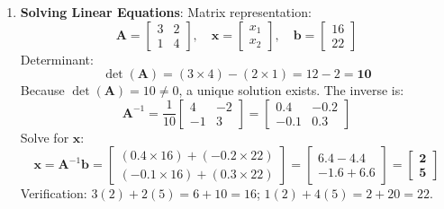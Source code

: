 \begin{enumerate}
    \item \textbf{Solving Linear Equations}:
    Matrix representation:
    \begin{equation*}
    \mathbf{A} = \begin{bmatrix} 3 & 2 \\ 1 & 4 \end{bmatrix}, \quad \mathbf{x} = \begin{bmatrix} x_1 \\ x_2 \end{bmatrix}, \quad \mathbf{b} = \begin{bmatrix} 16 \\ 22 \end{bmatrix}
    \end{equation*}
    Determinant:
    \begin{equation*}
    \det(\mathbf{A}) = (3 \times 4) - (2 \times 1) = 12 - 2 = \mathbf{10}
    \end{equation*}
    Because $\det(\mathbf{A}) = 10 \neq 0$, a unique solution exists.
    The inverse is:
    \begin{equation*}
    \mathbf{A}^{-1} = \frac{1}{10} \begin{bmatrix} 4 & -2 \\ -1 & 3 \end{bmatrix} = \begin{bmatrix} 0.4 & -0.2 \\ -0.1 & 0.3 \end{bmatrix}
    \end{equation*}
    Solve for $\mathbf{x}$:
    \begin{equation*}
    \mathbf{x} = \mathbf{A}^{-1} \mathbf{b} = \begin{bmatrix} (0.4 \times 16) + (-0.2 \times 22) \\ (-0.1 \times 16) + (0.3 \times 22) \end{bmatrix} = \begin{bmatrix} 6.4 - 4.4 \\ -1.6 + 6.6 \end{bmatrix} = \begin{bmatrix} \mathbf{2} \\ \mathbf{5} \end{bmatrix}
    \end{equation*}
    Verification: $3(2) + 2(5) = 6 + 10 = 16$; $1(2) + 4(5) = 2 + 20 = 22$.
\end{enumerate}